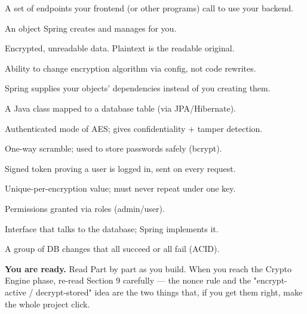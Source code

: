 \documentclass[11pt,a4paper]{article}
\begin{document}
\begin{description}[leftmargin=0pt,style=nextline]
  \item[API] A set of endpoints your frontend (or other programs) call to use your backend.
  \item[Bean] An object Spring creates and manages for you.
  \item[Ciphertext] Encrypted, unreadable data. Plaintext is the readable original.
  \item[Crypto-agility] Ability to change encryption algorithm via config, not code rewrites.
  \item[DI / IoC] Spring supplies your objects' dependencies instead of you creating them.
  \item[Entity] A Java class mapped to a database table (via JPA/Hibernate).
  \item[GCM] Authenticated mode of AES; gives confidentiality + tamper detection.
  \item[Hash] One-way scramble; used to store passwords safely (bcrypt).
  \item[JWT] Signed token proving a user is logged in, sent on every request.
  \item[Nonce / IV] Unique-per-encryption value; must never repeat under one key.
  \item[RBAC] Permissions granted via roles (admin/user).
  \item[Repository] Interface that talks to the database; Spring implements it.
  \item[Transaction] A group of DB changes that all succeed or all fail (ACID).
\end{description}

\vspace{1em}
\begin{tcolorbox}[colback=accent!5,colframe=accent!50]
\textbf{You are ready.} Read Part by part as you build. When you reach the Crypto Engine phase,
re-read Section 9 carefully — the nonce rule and the "encrypt-active / decrypt-stored" idea are the
two things that, if you get them right, make the whole project click.
\end{tcolorbox}
\end{document}
